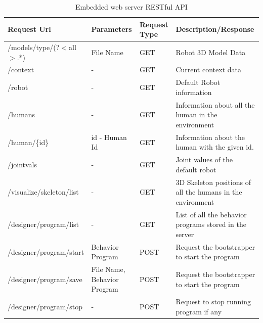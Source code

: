 \begin{table}[H]
\centering
\small
\caption{Embedded web server RESTful API}
\label{table:restful_api}
\begin{tabular}{|l|p{2.8cm}|p{1.2cm}|p{5.5cm}|}
\hline
  \textbf{Request Url}  & \textbf{Parameters} & \textbf{Request Type} & \textbf{Description/Response}
  \tabularnewline \hline
  /models/{type}/(?$<$all$>$.*) & File Name & GET & Robot 3D Model Data
                                          \tabularnewline\hline
                                          
  /context  & - & GET & Current context data  
  										                    \tabularnewline\hline
  										 
  /robot  &  - & GET & Default Robot information  
  										                    \tabularnewline\hline										 
  
  /humans & - & GET  & Information about all the human in the environment  
                                          \tabularnewline\hline
                                          
  /human/\{id\} & id - Human Id & GET  & Information about the human with the given id.  
                                          \tabularnewline\hline
                                          
  /jointvals & - & GET  & Joint values of the default robot  
                                          \tabularnewline\hline
                                          
  /visualize/skeleton/list & - & GET  & 3D Skeleton positions of all the humans in the environment  
                                          \tabularnewline\hline                                        
       
  /designer/program/list & - & GET  & List of all the behavior programs stored in the server  
                                          \tabularnewline\hline                                                               
                                          
  /designer/program/start & Behavior Program & POST  & Request the bootstrapper to start the program
  										                    \tabularnewline\hline   

  /designer/program/save & File Name, Behavior Program & POST  & Request the bootstrapper to start the program
                                          \tabularnewline\hline 
  /designer/program/stop & - & POST  & Request to stop running program if any
                                          \tabularnewline\hline
\end{tabular}
\end{table}
